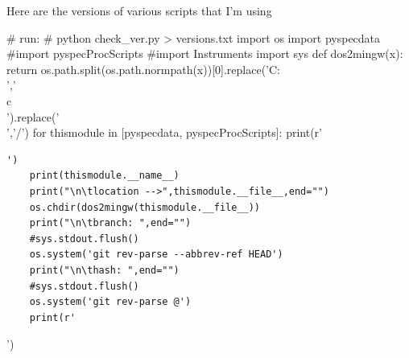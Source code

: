 \documentclass[10pt]{article}
\begin{document}
Here are the versions of various scripts that I'm using
\par
\begin{python}[on]
# run:
# python check_ver.py > versions.txt
import os
import pyspecdata
#import pyspecProcScripts
#import Instruments
import sys
def dos2mingw(x):
    return os.path.split(os.path.normpath(x))[0].replace('C:\\','\\c\\').replace('\\','/')
for thismodule in [pyspecdata, pyspecProcScripts]:
    print(r'\begin{verbatim}')
    print(thismodule.__name__)
    print("\n\tlocation -->",thismodule.__file__,end="")
    os.chdir(dos2mingw(thismodule.__file__))
    print("\n\tbranch: ",end="")
    #sys.stdout.flush()
    os.system('git rev-parse --abbrev-ref HEAD')
    print("\n\thash: ",end="")
    #sys.stdout.flush()
    os.system('git rev-parse @')
    print(r'\end{verbatim}')
\end{python}
\par
%
%
%
%
%

\end{document}
